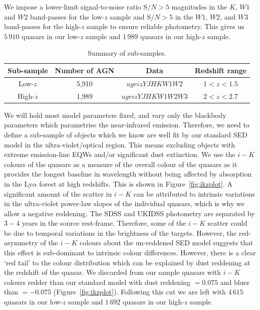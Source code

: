 We impose a lower-limit signal-to-noise ratio ${\mathrm S/N} > 5$ magnitudes in the $K$, $W1$ and $W2$ band-passes for the low-$z$ sample and ${\mathrm S/N} > 5$ in the $W1$, $W2$, and $W3$ band-passes for the high-$z$ sample to ensure reliable photometry.
This gives us $5\,910$ quasars in our low-$z$ sample and $1\,989$ quasars in our high-$z$ sample. 

\begin{table}
  \footnotesize
  \centering
  \begin{tabular}{cccc}
    \hline 
    Sub-sample & Number of AGN & Data & Redshift range \\
    \hline 
    Low-$z$ & 5,910 & $ugrizYJHKW1W2$ & $1 < z < 1.5$ \\
    High-$z$ & 1,989 & $ugrizYJHKW1W2W3$ & $2 < z < 2.7$ \\           
    \hline
  \end{tabular}
  \caption{Summary of sub-samples.}
  \label{tab:sub-samples}
\end{table}


We will hold most model parameters fixed, and vary only the blackbody parameters which parametrise the near-infrared emission. 
Therefore, we need to define a sub-sample of objects which we know are well fit by our standard SED model in the ultra-violet/optical region. 
This means excluding objects with extreme emission-line EQWs and/or significant dust extinction.
We use the $i-K$ colours of the quasars as a measure of the overall colour of the quasars as it provides the longest baseline in wavelength without being affected by absorption in the Ly$\alpha$ forest at high redshifts. 
This is shown in Figure~\ref{fig:ikzplot}.
A significant amount of the scatter in $i-K$ can be attributed to intrinsic variations in the ultra-violet power-law slopes of the individual quasars, which is why we allow a negative reddening. 
The SDSS and UKIDSS photometry are separated by $3-4$ years in the source rest-frame. 
Therefore, some of the $i-K$ scatter could be due to temporal variations in the brightness of the targets. 
However, the red-asymmetry of the $i-K$ colours about the un-reddened SED model suggests that this effect is sub-dominant to intrinsic colour differences. 
However, there is a clear `red tail' to the colour distribution which can be explained by dust reddening at the redshift of the quasar.
We discarded from our sample quasars with $i - K$ colours redder than our standard model with dust reddening \ebv $= 0.075$ and bluer than \ebv $=-0.075$ (Figure~\ref{fig:ikzplot}). 
Following this cut we are left with $4\,615$ quasars in our low-$z$ sample and $1\,692$ quasars in our high-$z$ sample. 

